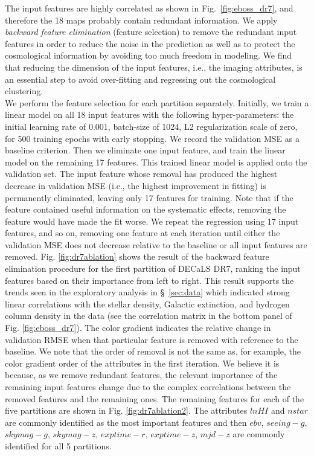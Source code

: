 \documentclass[fleqn, usenatbib]{mnras}
\begin{document}
The input features are highly correlated as shown in Fig.~\ref{fig:eboss_dr7}, and therefore the 18 maps probably contain redundant information.
We apply \textit{backward feature elimination} (feature selection) to remove the redundant input features in order to reduce the noise in the prediction as well as to protect the cosmological information by avoiding too much freedom in modeling. We find that reducing the dimension of the input features, i.e., the imaging attributes, is an essential step to avoid over-fitting and regressing out the cosmological clustering.\\

We perform the feature selection for each partition separately. Initially, we train a linear model on all 18 input features with the following hyper-parameters: the initial learning rate of 0.001, batch-size of 1024, L2 regularization scale of zero, for 500 training epochs with early stopping. We record the validation MSE as a baseline criterion. Then we eliminate one input feature, and train the linear model on the remaining 17 features. This trained linear model is applied onto the validation set. The input feature whose removal has produced the highest decrease in validation MSE (i.e., the highest improvement in fitting) is permanently eliminated, leaving only 17 features for training. Note that if the feature contained useful information on the systematic effects, removing the feature would have made the fit worse. We repeat the regression using 17 input features, and so on, removing one feature at each iteration until either the validation MSE does not decrease relative to the baseline or all input features are removed. Fig. \ref{fig:dr7ablation} shows the result of the backward feature elimination procedure for the first partition of DECaLS DR7, ranking the input features based on their importance from left to right. This result supports the trends seen in the exploratory analysis in \S~\ref{sec:data} which indicated strong linear correlations with the stellar density, Galactic extinction, and hydrogen column density in the data (see the correlation matrix in the bottom panel of Fig. \ref{fig:eboss_dr7}). The color gradient indicates the relative change in validation RMSE when that particular feature is removed with reference to the baseline. We note that the order of removal is not the same as, for example, the color gradient order of the attributes in the first iteration. We believe it is because, as we remove redundant features, the relevant importance of the remaining input features change due to the complex correlations between the removed features and the remaining ones. The remaining features for each of the five partitions are shown in Fig. \ref{fig:dr7ablation2}. The attributes $lnHI$ and $nstar$ are commonly identified as the most important features and then $ebv$, $seeing-g$, $skymag-g$, $skymag-z$, $exptime-r$, $exptime-z$, $mjd-z$ are commonly identified for all 5 partitions.\\
\end{document}
